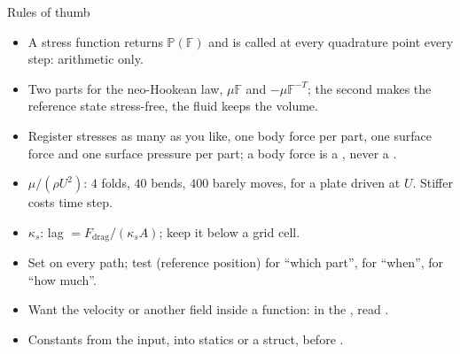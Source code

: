 \documentclass[aspectratio=169,11pt]{beamer}
\begin{document}
\begin{frame}{Rules of thumb}
\label{fr:thumb}
\small
\begin{itemize}
  \item A stress function returns $\mathbb{P}(\mathbb{F})$ and is called at every quadrature point every step: arithmetic only.
  \item Two parts for the neo-Hookean law, $\mu\mathbb{F}$ and $-\mu\mathbb{F}^{-T}$; the second makes the reference state stress-free, the fluid keeps the volume.
  \item Register stresses as many as you like, one body force per part, one surface force and one surface pressure per part; a body force is a , never a .
  \item $\mu/(\rho U^2)$: $4$ folds, $40$ bends, $400$ barely moves, for a plate driven at $U$. Stiffer costs time step.
  \item $\kappa_s$: lag $= F_{\mathrm{drag}}/(\kappa_s A)$; keep it below a grid cell.
  \item Set  on every path; test  (reference position) for ``which part'',  for ``when'',  for ``how much''.
  \item Want the velocity or another field inside a function:  in the , read .
  \item Constants from the input, into  statics or a  struct, before .
\end{itemize}
\end{frame}
\end{document}
